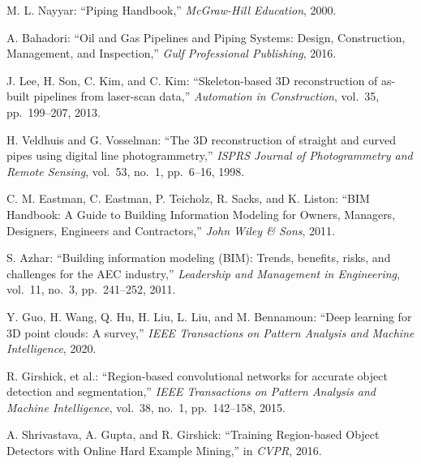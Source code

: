 

\begin{thebibliography}{99}				%

	M. L. Nayyar: 
			``Piping Handbook,'' 
			{\it McGraw-Hill Education}, 2000.

	A. Bahadori: 
			``Oil and Gas Pipelines and Piping Systems: Design, Construction, Management, and Inspection,'' 
			{\it Gulf Professional Publishing}, 2016.

	J. Lee, H. Son, C. Kim, and C. Kim: 
			``Skeleton-based 3D reconstruction of as-built pipelines from laser-scan data,'' 
			{\it Automation in Construction}, 
			vol.~35, pp.~199--207, 2013.

	H. Veldhuis and G. Vosselman: 
			``The 3D reconstruction of straight and curved pipes using digital line photogrammetry,'' 
			{\it ISPRS Journal of Photogrammetry and Remote Sensing}, 
			vol.~53, no.~1, pp.~6--16, 1998.

	C. M. Eastman, C. Eastman, P. Teicholz, R. Sacks, and K. Liston: 
			``BIM Handbook: A Guide to Building Information Modeling for Owners, Managers, Designers, Engineers and Contractors,'' 
			{\it John Wiley \& Sons}, 2011.

	S. Azhar: 
			``Building information modeling (BIM): Trends, benefits, risks, and challenges for the AEC industry,'' 
			{\it Leadership and Management in Engineering}, 
			vol.~11, no.~3, pp.~241--252, 2011.

	Y. Guo, H. Wang, Q. Hu, H. Liu, L. Liu, and M. Bennamoun: 
    ``Deep learning for 3D point clouds: A survey,'' 
    {\it IEEE Transactions on Pattern Analysis and Machine Intelligence}, 2020.
	
	R. Girshick, et al.: 
			``Region-based convolutional networks for accurate object detection and segmentation,'' 
			{\it IEEE Transactions on Pattern Analysis and Machine Intelligence}, 
			vol.~38, no.~1, pp.~142--158, 2015.

		A. Shrivastava, A. Gupta, and R. Girshick: 
				``Training Region-based Object Detectors with Online Hard Example Mining,'' 
				in {\it CVPR}, 2016.
			

\end{thebibliography}
